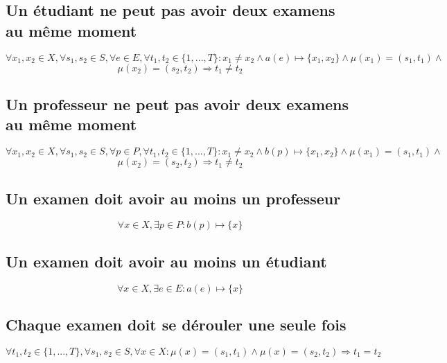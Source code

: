 \documentclass[a4paper,11pt]{article}
\begin{document}
\subsection {Un étudiant ne peut pas avoir deux examens au même moment}
\begin{displaymath}
\forall x_{1},x_{2} \in X, \forall s_{1},s_{2} \in S , \forall e \in E ,\forall t_{1}, t_{2} \in \{1,...,T\} :  x_{1} \neq x_{2} \wedge a(e) \mapsto \{x_{1},x_{2}\}  \wedge \mu(x_{1}) = (s_{1},t_{1}) \wedge\end{displaymath}
\begin{displaymath}
 \mu(x_{2}) = (s_{2},t_{2}) \Rightarrow t_{1} \neq t_{2} 
\end{displaymath}

\subsection {Un professeur ne peut pas avoir deux examens au même moment}
\begin{displaymath}
\forall x_{1},x_{2} \in X, \forall s_{1},s_{2} \in S , \forall p \in P ,\forall t_{1}, t_{2} \in \{1,...,T\} :  x_{1} \neq x_{2} \wedge b(p) \mapsto \{x_{1},x_{2}\}  \wedge \mu(x_{1}) = (s_{1},t_{1}) \wedge\end{displaymath}
\begin{displaymath}
 \mu(x_{2}) = (s_{2},t_{2}) \Rightarrow t_{1} \neq t_{2} 
\end{displaymath}

\subsection {Un examen doit avoir au moins un professeur}
\begin{displaymath}
\forall x \in X, \exists p \in P : b(p) \mapsto \{x\} 
\end{displaymath}

\subsection {Un examen doit avoir au moins un étudiant}
\begin{displaymath}
\forall x \in X, \exists e \in E : a(e) \mapsto \{x\}
\end{displaymath}

\subsection {Chaque examen doit se dérouler une seule fois}
\begin{displaymath}
\forall t_{1}, t_{2} \in \{1,...,T\},\forall s_{1},s_{2} \in S, \forall x \in X : \mu(x) = (s_{1},t_{1}) \wedge \mu(x) = (s_{2},t_{2}) \Rightarrow t_{1} = t_{2}
\end{displaymath}
\end{document}
